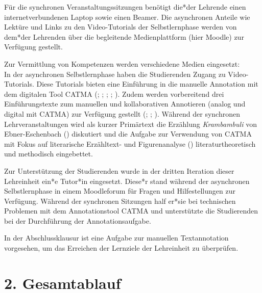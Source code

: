 \documentclass[
          a4paper,
        ]{article}
\begin{document}
Für die synchronen Veranstaltungssitzungen benötigt die*der Lehrende
einen internetverbundenen Laptop sowie einen Beamer. Die asynchronen
Anteile wie Lektüre und Links zu den Video-Tutorials der Selbstlernphase
werden von dem*der Lehrenden über die begleitende Medienplattform (hier
Moodle) zur Verfügung gestellt.

Zur Vermittlung von Kompetenzen werden verschiedene Medien eingesetzt:\\
In der asynchronen Selbstlernphase haben die Studierenden Zugang zu
Video-Tutorials. Diese Tutorials bieten eine Einführung in die manuelle
Annotation mit dem digitalen Tool CATMA
(;
;
;
;
). Zudem werden
vorbereitend drei Einführungstexte zum manuellen und kollaborativen
Annotieren (analog und digital mit CATMA) zur Verfügung gestellt
(;
;
). Während der synchronen Lehrveranstaltungen wird als kurzer
Primärtext die Erzählung \emph{Krambambuli} von Ebner-Eschenbach
() diskutiert und
die Aufgabe zur Verwendung von CATMA mit Fokus auf literarische
Erzähltext- und Figurenanalyse
() literaturtheoretisch
und methodisch eingebettet.

Zur Unterstützung der Studierenden wurde in der dritten Iteration dieser
Lehreinheit ein*e Tutor*in eingesetzt. Diese*r stand während der
asynchronen Selbstlernphase in einem Moodleforum für Fragen und
Hilfestellungen zur Verfügung. Während der synchronen Sitzungen half
er*sie bei technischen Problemen mit dem Annotationstool CATMA und
unterstützte die Studierenden bei der Durchführung der
Annotationsaufgabe.

In der Abschlussklausur ist eine Aufgabe zur manuellen Textannotation
vorgesehen, um das Erreichen der Lernziele der Lehreinheit zu
überprüfen.

\section{2. Gesamtablauf}\label{gesamtablauf}
\end{document}
